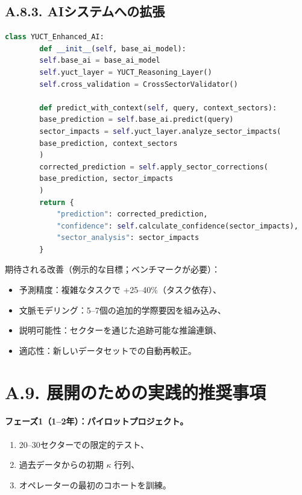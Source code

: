 \documentclass[13pt,a4paper]{ltjsarticle}
\begin{document}
	\subsection*{A.8.3. AIシステムへの拡張}
	
	\begin{lstlisting}[language=Python]
		class YUCT_Enhanced_AI:
		def __init__(self, base_ai_model):
		self.base_ai = base_ai_model
		self.yuct_layer = YUCT_Reasoning_Layer()
		self.cross_validation = CrossSectorValidator()
		
		def predict_with_context(self, query, context_sectors):
		base_prediction = self.base_ai.predict(query)
		sector_impacts = self.yuct_layer.analyze_sector_impacts(
		base_prediction, context_sectors
		)
		corrected_prediction = self.apply_sector_corrections(
		base_prediction, sector_impacts
		)
		return {
			"prediction": corrected_prediction,
			"confidence": self.calculate_confidence(sector_impacts),
			"sector_analysis": sector_impacts
		}
	\end{lstlisting}
	
	期待される改善（例示的な目標；ベンチマークが必要）：
	\begin{itemize}[leftmargin=*]
		\item 予測精度：複雑なタスクで +25--40\%（タスク依存）、
		\item 文脈モデリング：5--7個の追加的学際要因を組み込み、
		\item 説明可能性：セクターを通じた追跡可能な推論連鎖、
		\item 適応性：新しいデータセットでの自動再較正。
	\end{itemize}
	
	\section*{A.9. 展開のための実践的推奨事項}
	
	\paragraph{フェーズ1（1--2年）：パイロットプロジェクト。}
	\begin{enumerate}[leftmargin=*]
		\item 20--30セクターでの限定的テスト、
		\item 過去データからの初期 $\kappa$ 行列、
		\item オペレーターの最初のコホートを訓練。
	\end{enumerate}
	
\end{document}
